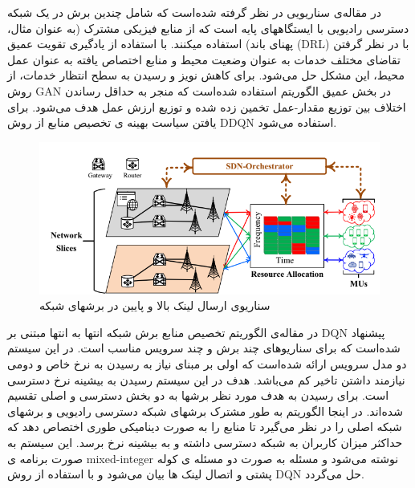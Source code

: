 در مقاله‌ی
 \cite{gan1, gan2}
سناریویی در نظر گرفته شده‌است که شامل چندین برش در یک شبکه دسترسی رادیویی با ایستگاههای پایه است که از منابع فیزیکی مشترک (به عنوان مثال، پهنای باند) استفاده میکنند. 
با استفاده از یادگیری تقویت عمیق (DRL) با در نظر گرفتن تقاضای مختلف خدمات به عنوان وضعیت محیط و منابع اختصاص یافته به عنوان عمل محیط، این مشکل حل می‌شود.
برای کاهش نویز و رسیدن به سطح انتظار خدمات، از روش GAN در بخش عمیق الگوریتم استفاده شده‌است که منجر به حداقل رساندن اختلاف بین توزیع مقدار-عمل تخمین زده شده و توزیع ارزش عمل هدف
می‌شود.
برای یافتن سیاست بهینه ی تخصیص منابع از روش
DDQN 
 استفاده می‌شود.
\begin{figure}
  \centering
    \includegraphics[scale=0.7]{./fig/gan}
  \caption{سناریوی ارسال لینک بالا و پایین در برشهای شبکه }
  \label{fig:gan}
\end{figure} 
 
در مقاله‌ی
\cite{li2020end} 
الگوریتم تخصیص منابع برش شبکه انتها به انتها مبتنی بر 
DQN 
 پیشنهاد شده‌است که برای سناریوهای چند برش و چند سرویس مناسب است.
 در این سیستم دو مدل سرویس ارائه شده‌است که اولی بر مبنای نیاز به رسیدن به نرخ خاص و دومی نیازمند داشتن تاخیر کم می‌باشد.
هدف در این سیستم رسیدن به بیشینه نرخ دسترسی است.
برای رسیدن به هدف مورد نظر برشها به دو بخش دسترسی و اصلی تقسیم شده‌اند.
 در اینجا الگوریتم به طور مشترک برشهای شبکه دسترسی رادیویی و برشهای شبکه اصلی را در نظر می‌گیرد تا منابع را به صورت دینامیکی طوری اختصاص دهد که 
 حداکثر میزان کاربران به شبکه دسترسی داشته و به بیشینه نرخ برسد.
 این سیستم به صورت برنامه ی
 mixed-integer
 نوشته می‌شود
و مسئله به صورت دو مسئله ی کوله پشتی و اتصال لینک ها بیان می‌شود
  و با استفاده از روش
 DQN
 حل می‌گردد.
 